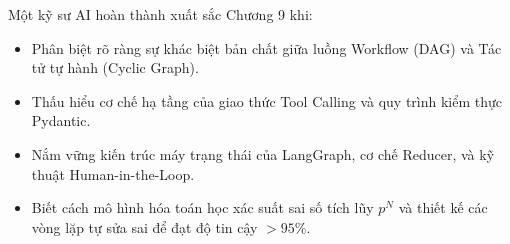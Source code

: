 \begin{checkpointbox}
Một kỹ sư AI hoàn thành xuất sắc Chương 9 khi:
\begin{itemize}
  \item Phân biệt rõ ràng sự khác biệt bản chất giữa luồng Workflow (DAG) và Tác tử tự hành (Cyclic Graph).
  \item Thấu hiểu cơ chế hạ tầng của giao thức Tool Calling và quy trình kiểm thực Pydantic.
  \item Nắm vững kiến trúc máy trạng thái của LangGraph, cơ chế Reducer, và kỹ thuật Human-in-the-Loop.
  \item Biết cách mô hình hóa toán học xác suất sai số tích lũy $p^N$ và thiết kế các vòng lặp tự sửa sai để đạt độ tin cậy $>95\%$.
\end{itemize}
\end{checkpointbox}
